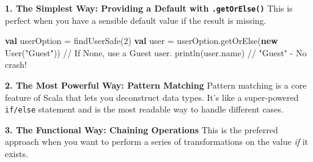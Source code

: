 \documentclass[
  letterpaper,
  DIV=11,
  numbers=noendperiod]{scrreprt}
\newenvironment{Shaded}{\begin{snugshade}}{\end{snugshade}}
\newcommand{\BuiltInTok}[1]{\textcolor[rgb]{0.00,0.23,0.31}{#1}}
\newcommand{\CommentTok}[1]{\textcolor[rgb]{0.37,0.37,0.37}{#1}}
\newcommand{\ControlFlowTok}[1]{\textcolor[rgb]{0.00,0.23,0.31}{\textbf{#1}}}
\newcommand{\DecValTok}[1]{\textcolor[rgb]{0.68,0.00,0.00}{#1}}
\newcommand{\FunctionTok}[1]{\textcolor[rgb]{0.28,0.35,0.67}{#1}}
\newcommand{\KeywordTok}[1]{\textcolor[rgb]{0.00,0.23,0.31}{\textbf{#1}}}
\newcommand{\NormalTok}[1]{\textcolor[rgb]{0.00,0.23,0.31}{#1}}
\newcommand{\OperatorTok}[1]{\textcolor[rgb]{0.37,0.37,0.37}{#1}}
\newcommand{\SpecialStringTok}[1]{\textcolor[rgb]{0.13,0.47,0.30}{#1}}
\newcommand{\StringTok}[1]{\textcolor[rgb]{0.13,0.47,0.30}{#1}}
\begin{document}
\textbf{1. The Simplest Way: Providing a Default with
\texttt{.getOrElse()}} This is perfect when you have a sensible default
value if the result is missing.

\begin{Shaded}
\begin{Highlighting}[]
\KeywordTok{val}\NormalTok{ userOption }\OperatorTok{=} \FunctionTok{findUserSafe}\OperatorTok{(}\DecValTok{2}\OperatorTok{)}
\KeywordTok{val}\NormalTok{ user }\OperatorTok{=}\NormalTok{ userOption}\OperatorTok{.}\FunctionTok{getOrElse}\OperatorTok{(}\KeywordTok{new} \FunctionTok{User}\OperatorTok{(}\StringTok{"Guest"}\OperatorTok{))} \CommentTok{// If None, use a Guest user.}
\FunctionTok{println}\OperatorTok{(}\NormalTok{user}\OperatorTok{.}\NormalTok{name}\OperatorTok{)} \CommentTok{// "Guest" {-} No crash!}
\end{Highlighting}
\end{Shaded}

\textbf{2. The Most Powerful Way: Pattern Matching} Pattern matching is
a core feature of Scala that lets you deconstruct data types. It's like
a super-powered \texttt{if/else} statement and is the most readable way
to handle different cases.

\begin{Shaded}
\end{Shaded}

\textbf{3. The Functional Way: Chaining Operations} This is the
preferred approach when you want to perform a series of transformations
on the value \emph{if} it exists.
\end{document}
